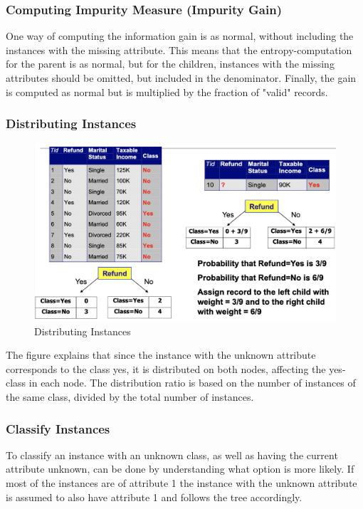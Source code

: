 \subsubsection{Computing Impurity Measure (Impurity Gain)}
One way of computing the information gain is as normal, without including the instances with the missing attribute.
This means that the entropy-computation for the parent is as normal, but for the children, instances with the missing attributes should be omitted, but included in the denominator. Finally, the gain is computed as normal but is multiplied by the fraction of "valid" records.

\subsubsection{Distributing Instances}
\begin{figure}[H]
    \centering
    \includegraphics[scale=0.5]{figures/distributeinstances.png}
    \caption{Distributing Instances}
\end{figure}
The figure explains that since the instance with the unknown attribute corresponds to the class yes, it is distributed on both nodes, affecting the yes-class in each node.
The distribution ratio is based on the number of instances of the same class, divided by the total number of instances.

\subsubsection{Classify Instances}
To classify an instance with an unknown class, as well as having the current attribute unknown, can be done by understanding what option is more likely.
If most of the instances are of attribute 1 the instance with the unknown attribute is assumed to also have attribute 1 and follows the tree accordingly.

